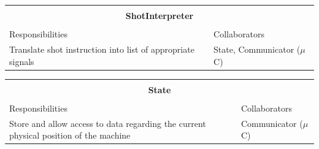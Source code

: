\documentclass[titlepage]{article}
\begin{document}
\begin{table}[!htbp]
\centering
\begin{tabular}{| p{} | p{} |}\hline
	\multicolumn{2}{|l|}{}\\
	\multicolumn{2}{|c|}{\large{\textbf{ShotInterpreter}}}\\
	\multicolumn{2}{|l|}{}\\\hline
	\vspace{0mm}\large{Responsibilities}\vspace{2mm} &\vspace{0mm}\large{Collaborators}\vspace{2mm}\\\hline
	\vspace{0mm}Translate shot instruction into list of appropriate signals 	&\vspace{0mm}State, Communicator ($\mu$C)\vspace{2mm}\\\hline
\end{tabular}
\end{table}

\begin{table}[!htbp]
\centering
\begin{tabular}{| p{} | p{} |}\hline
	\multicolumn{2}{|l|}{}\\
	\multicolumn{2}{|c|}{\large{\textbf{State}}}\\
	\multicolumn{2}{|l|}{}\\\hline
	\vspace{0mm}\large{Responsibilities}\vspace{2mm} &\vspace{0mm}\large{Collaborators}\vspace{2mm}\\\hline
	\vspace{0mm}Store and allow access to data regarding the current physical position of the machine	&\vspace{0mm}Communicator ($\mu$C)\vspace{2mm}\vspace{2mm}\\\hline
\end{tabular}
\end{table}
\newpage
\end{document}
